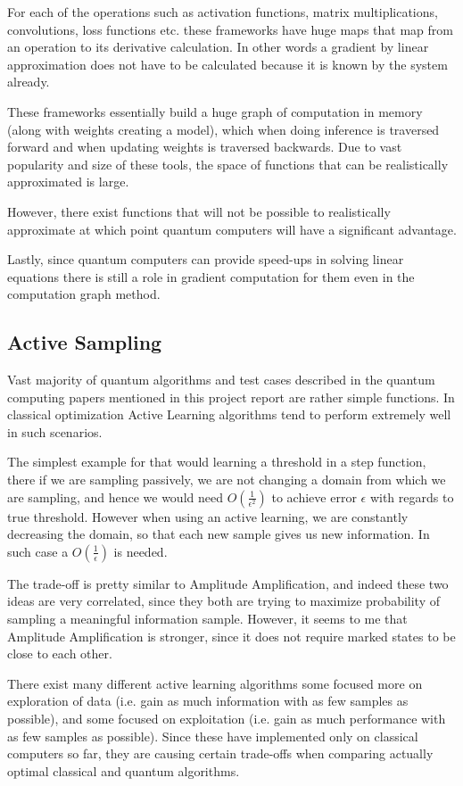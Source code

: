 \documentclass{article}
\begin{document}
For each of the operations such as activation functions, matrix multiplications, convolutions, loss functions etc.
these frameworks have huge maps that map from an operation to its derivative calculation.
In other words a gradient by linear approximation does not have to be calculated because it is known by the system already.

These frameworks essentially build a huge graph of computation in memory (along with weights creating a model), which when
doing inference is traversed forward and when updating weights is traversed backwards.
Due to vast popularity and size of these tools, the space of functions that can be realistically approximated is large.

However, there exist functions that will not be possible to realistically approximate at which point quantum computers will
have a significant advantage.

Lastly, since quantum computers can provide speed-ups in solving linear equations there is still a role in gradient computation
for them even in the computation graph method.

\subsection{Active Sampling}
Vast majority of quantum algorithms and test cases described in the quantum computing papers mentioned in this project report
are rather simple functions. In classical optimization Active Learning algorithms tend to perform extremely well in such scenarios.

The simplest example for that would learning a threshold in a step function, there if we are sampling passively,
we are not changing a domain from which we are sampling, and hence we would need $O(\frac{1}{\epsilon^2})$ to achieve error $\epsilon$
with regards to true threshold.
However when using an active learning, we are constantly decreasing the domain, so that each new sample gives us new information.
In such case a $O(\frac{1}{\epsilon})$ is needed.

The trade-off is pretty similar to Amplitude Amplification, and indeed these two ideas are very correlated, since they both are trying to
maximize probability of sampling a meaningful information sample. However, it seems to me that Amplitude Amplification is stronger,
since it does not require marked states to be close to each other.

There exist many different active learning algorithms some focused more on exploration of data (i.e. gain as much information with as few samples as possible),
and some focused on exploitation (i.e. gain as much performance with as few samples as possible).
Since these have implemented only on classical computers so far, they are causing certain trade-offs when comparing actually
optimal classical and quantum algorithms.
\end{document}
